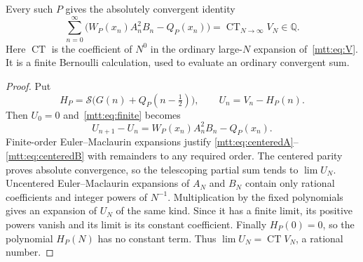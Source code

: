 \begin{corollary}\label{mtt:cor:sum}
Every such $P$ gives the absolutely convergent identity
\begin{equation}\label{mtt:eq:ordinary}
 \sum_{n=0}^{\infty}
 \bigl(W_P(x_n)A_n^2B_n-Q_P(x_n)\bigr)
 =\operatorname{CT}_{N\to\infty}V_N\in\mathbb Q.
\end{equation}
Here $\operatorname{CT}$ is the coefficient of $N^0$ in the ordinary
large-$N$ expansion of~\eqref{mtt:eq:V}. It is a finite Bernoulli
calculation, used to evaluate an ordinary convergent sum.
\end{corollary}
\begin{proof}
Put
\[
 H_P=\mathcal S\bigl(G(n)+Q_P(n-\tfrac12)\bigr),\qquad U_n=V_n-H_P(n).
\]
Then $U_0=0$ and~\eqref{mtt:eq:finite} becomes
\[
 U_{n+1}-U_n=W_P(x_n)A_n^2B_n-Q_P(x_n).
\]
Finite-order Euler--Maclaurin expansions justify
\eqref{mtt:eq:centeredA}--\eqref{mtt:eq:centeredB} with remainders
to any required order. The centered parity proves absolute convergence,
so the telescoping partial sum tends to $\lim U_N$. Uncentered
Euler--Maclaurin expansions of $A_N$ and $B_N$ contain only rational
coefficients and integer powers of $N^{-1}$. Multiplication by the
fixed polynomials gives an expansion of $U_N$ of the same kind.
Since it has a finite limit, its positive powers vanish and its limit
is its constant coefficient. Finally $H_P(0)=0$, so the polynomial
$H_P(N)$ has no constant term. Thus
$\lim U_N=\operatorname{CT}V_N$, a rational number.
\end{proof}

